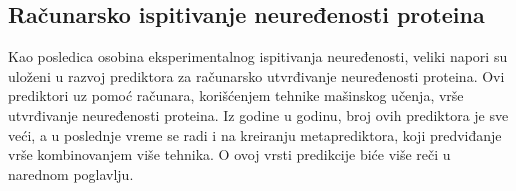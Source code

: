 \subsection{Računarsko ispitivanje neuređenosti proteina}

Kao posledica osobina eksperimentalnog ispitivanja neuređenosti, veliki napori su uloženi u razvoj prediktora za računarsko utvrđivanje neuređenosti proteina. Ovi prediktori uz pomoć računara, korišćenjem tehnike mašinskog učenja, vrše utvrđivanje neuređenosti proteina. Iz godine u godinu, broj ovih prediktora je sve veći, a u poslednje vreme se radi i na kreiranju metaprediktora, koji predviđanje vrše kombinovanjem više tehnika. O ovoj vrsti predikcije biće više reči u narednom poglavlju.\\
